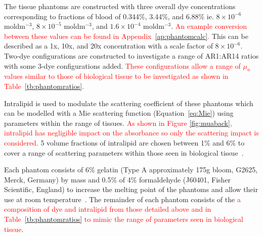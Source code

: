 The tissue phantoms are constructed with three overall dye concentrations corresponding to fractions of blood of 0.344\%, 3.44\%, and 6.88\% ie. $8\times10^{-6}$ moldm$^{-3}$, $8\times10^{-5}$ moldm$^{-3}$, and $1.6\times10^{-4}$ moldm$^{-3}$. \textcolor{red}{An example conversion between these values can be found in Appendix~\ref{ap:phantomcalc}.} This can be described as a 1x, 10x, and 20x concentration with a scale factor of $8\times10^{-6}$.
Two-dye configurations are constructed to investigate a range of AR1:AR14 ratios with some 3-dye configurations added. \textcolor{red}{These configurations allow a range of $\mu_a$ values similar to those of biological tissue to be investigated as shown in Table~\ref{tb:phantomratios}.}

Intralipid is used to modulate the scattering coefficient of these phantoms which can be modelled with a Mie scattering function (Equation~\eqref{eq:Mie}) using parameters within the range of tissues. \textcolor{red}{As shown in Figure \ref{fig:muaback}, intralipid has negligible impact on the absorbance so only the scattering impact is considered.} 5 volume fractions of intralipid are chosen between 1\% and 6\% to cover a range of scattering parameters within those seen in biological tissue~\citep{Jacques2013}. 

Each phantom consists of 6\% gelatin (Type A approximately 175g bloom, G2625, Merck, Germany) by mass %
and 0.5\% of 4\% formaldehyde (J60401, Fisher Scientific, England) to increase the melting point of the phantoms and allow their use at room temperature~\citep{Pogue2006}. The remainder of each phantom consists of the \textcolor{red}{a composition of dye and intralipid from those detailed above and in Table~\ref{tb:phantomratios} to mimic the range of parameters seen in biological tissue}. 

